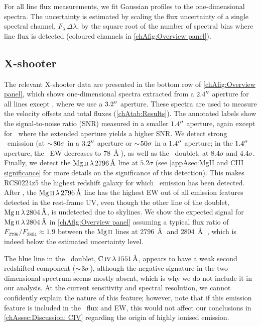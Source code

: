 For all line flux measurements, we fit Gaussian profiles to the one-dimensional spectra. The uncertainty is estimated by scaling the flux uncertainty of a single spectral channel, $F_\lambda \, \Delta \lambda$, by the square root of the number of spectral bins where line flux is detected (coloured channels in \cref{chAfig:Overview panel}).

\subsection{X-shooter}
\label{chAssec:Results: X-shooter}

The relevant X-shooter data are presented in the bottom row of \cref{chAfig:Overview panel}, which shows one-dimensional spectra extracted from a $2.4 \hbox{$^{\prime\prime}$}$ aperture for all lines except \lya, where we use a $3.2 \hbox{$^{\prime\prime}$}$ aperture. These spectra are used to measure the velocity offsets and total fluxes (\cref{chAtab:Results}). The annotated labels show the signal-to-noise ratio (SNR) measured in a smaller $1.4 \hbox{$^{\prime\prime}$}$ aperture, again except for \lya\ where the extended aperture yields a higher SNR. We detect strong \lya\ emission (at $\sim \! 80 \sigma$ in a $3.2 \hbox{$^{\prime\prime}$}$ aperture or $\sim \! 50 \sigma$ in a $1.4 \hbox{$^{\prime\prime}$}$ aperture; in the $1.4 \hbox{$^{\prime\prime}$}$ aperture, the \lya\ EW decreases to $78 \, \Angstrom$), as well as the \CIV\ doublet, at $8.4 \sigma$ and $4.4 \sigma$. Finally, we detect the $\MgII \, \lambda \, 2796 \, \Angstrom$ line at $5.2 \sigma$ (see \cref{appAsec:MgII and CIII significance} for more details on the significance of this detection). This makes RCS0224z5 the highest redshift galaxy for which \MgII\ emission has been detected. After \lya, the $\MgII \, \lambda \, 2796 \, \Angstrom$ line has the highest EW out of all emission features detected in the rest-frame UV, even though the other line of the doublet, $\MgII \, \lambda \, 2804 \, \Angstrom$, is undetected due to skylines. We show the expected signal for $\MgII \, \lambda \, 2804 \, \Angstrom$ in \cref{chAfig:Overview panel} assuming a typical flux ratio of $F_{2796}/F_{2804} \approx 1.9$ between the $\MgII$ lines at $2796 \, \Angstrom$ and $2804 \, \Angstrom$ \citep[e.g.][]{2018ApJ...855...96H}, which is indeed below the estimated uncertainty level.

The blue line in the \CIV\ doublet, $\CIV \, \lambda \, 1551 \, \Angstrom$, appears to have a weak second redshifted component ($\sim \! 3 \sigma$), although the negative signature in the two-dimensional spectrum seems mostly absent, which is why we do not include it in our analysis. At the current sensitivity and spectral resolution, we cannot confidently explain the nature of this feature; however, note that if this emission feature is included in the \CIV\ flux and EW, this would not affect our conclusions in \cref{chAssec:Discussion: CIV} regarding the origin of highly ionised emission.

